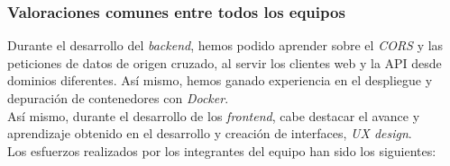 \documentclass[11pt, a4paper, titlepage]{article}
\begin{document}
\subsubsection{Valoraciones comunes entre todos los equipos}

Durante el desarrollo del \textit{backend}, hemos podido aprender sobre el \textit{CORS} y las peticiones de datos de origen cruzado, al servir los clientes web y la API desde dominios diferentes. Así mismo, hemos ganado experiencia en el despliegue y depuración de contenedores con \textit{Docker}. \\

Así mismo, durante el desarrollo de los \textit{frontend}, cabe destacar el avance y aprendizaje obtenido en el desarrollo y creación de interfaces, \textit{UX design}.\\

Los esfuerzos realizados por los integrantes del equipo han sido los siguientes:
\end{document}
